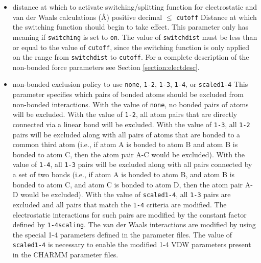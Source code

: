 \begin{itemize}

\item
{}
{distance at which to activate switching/splitting function 
for electrostatic and van der Waals calculations (\AA)}
{positive decimal $\leq$ {\tt cutoff}}
{Distance at which the switching function
should begin to take effect.  
This parameter only has meaning if {\tt switching} is 
set to {\tt on}.  
The value of {\tt switchdist} must be less than
or equal to the value of {\tt cutoff}, since the switching function
is only applied on the range from {\tt switchdist} to {\tt cutoff}.  
For a complete description of the non-bonded force parameters see
Section \ref{section:electdesc}.}

\item
{}
{non-bonded exclusion policy to use}
{{\tt none}, {\tt 1-2}, {\tt 1-3}, {\tt 1-4}, or {\tt scaled1-4}}
{\label{param:exclude}
This parameter specifies which pairs of bonded atoms should
be excluded from non-bonded
interactions.  With the value of {\tt none}, no bonded pairs of atoms 
will be excluded.  With the value of {\tt 1-2}, all atom pairs that
are directly connected via a linear bond will be excluded.  With the
value of {\tt 1-3}, all {\tt 1-2} pairs will be excluded along with
all pairs of atoms that are bonded to a common
third atom (i.e., if atom A is bonded to atom B and atom B is bonded
to atom C, then the atom pair A-C would be excluded).
With the value of {\tt 1-4}, all {\tt 1-3} pairs will be excluded along
with all pairs connected by a set of two bonds (i.e., if atom A is bonded
to atom B, and atom B is bonded to atom C, and atom C is bonded to
atom D, then the atom pair A-D would be excluded).  With the value
of {\tt scaled1-4}, all {\tt 1-3} pairs are excluded and all pairs
that match the {\tt 1-4} criteria are modified.  The electrostatic
interactions for such pairs are modified by the constant factor
defined by {\tt 1-4scaling}.  
The van der Waals interactions are modified
by using the special 1-4 parameters defined in the parameter files.
The value of {\tt scaled1-4} is necessary to enable the modified
1-4 VDW parameters present in the CHARMM parameter files.
}


\end{itemize}
